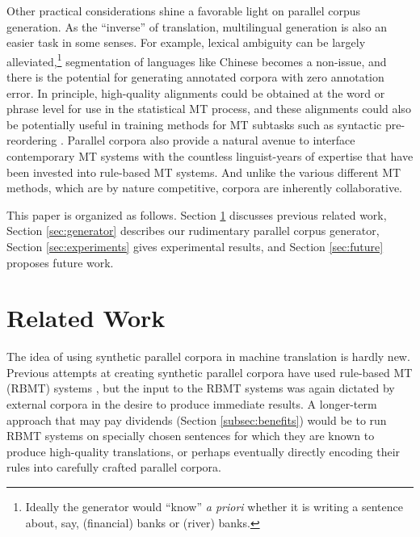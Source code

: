 Other practical considerations shine a favorable light on parallel corpus generation.
As the ``inverse'' of translation, multilingual generation is also an easier task in some senses.
For example, lexical ambiguity can be largely alleviated,\footnote{
    Ideally the generator would ``know'' {\em a priori} whether it is writing a sentence about, say, (financial) banks or (river) banks.
} segmentation of languages like Chinese  becomes a non-issue, and there is the potential for generating annotated corpora with zero annotation error.
In principle, high-quality alignments could be obtained at the word or phrase level for use in the statistical MT process, and these alignments 
could also be potentially useful in training methods for MT subtasks such as syntactic pre-reordering .
Parallel corpora also provide a natural avenue to interface contemporary MT systems with the countless linguist-years of expertise that have been invested into rule-based MT systems. %
And unlike the various different MT methods, which are by nature competitive, corpora are inherently collaborative.

This paper is organized as follows.
Section \ref{sec:related} discusses previous related work,
Section \ref{sec:generator} describes our rudimentary parallel corpus generator,
Section \ref{sec:experiments} gives experimental results, 
and Section \ref{sec:future} proposes future work.



\section{Related Work}
\label{sec:related}

The idea of using synthetic parallel corpora in machine translation is hardly new.
Previous attempts at creating synthetic parallel corpora have used rule-based MT (RBMT) systems , but the input to the RBMT systems was again dictated by external corpora in the desire to produce immediate results.
A longer-term approach that may pay dividends (Section \ref{subsec:benefits}) would be to run RBMT systems on specially chosen sentences for which they are known to produce high-quality translations, or perhaps eventually directly encoding their rules into carefully crafted parallel corpora.

